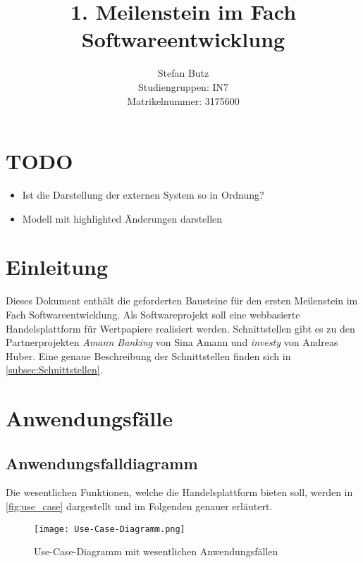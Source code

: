 \documentclass[12pt, a4paper, titlepage]{article}
\begin{document}
\title{1. Meilenstein im Fach Softwareentwicklung}
\author{Stefan Butz \\
		Studiengruppen: IN7 \\
		Matrikelnummer: 3175600}

\maketitle

\section{TODO}
\begin{itemize}
	\item Ist die Darstellung der externen System so in Ordnung?
	\item Modell mit highlighted Änderungen darstellen
\end{itemize}

\section{Einleitung}
Dieses Dokument enthält die geforderten Bausteine für den ersten Meilenstein
im Fach Softwareentwicklung.
Als Softwareprojekt soll eine webbasierte Handelsplattform für Wertpapiere
realisiert werden.
Schnittstellen gibt es zu den Partnerprojekten \textit{Amann Banking} von Sina
Amann und \textit{investy} von Andreas Huber.
Eine genaue Beschreibung der Schnittstellen finden sich in
\autoref{subsec:Schnittstellen}.

\section{Anwendungsfälle}
\label{sec:use_case}
\subsection{Anwendungsfalldiagramm}
Die wesentlichen Funktionen, welche die Handelsplattform  bieten soll, werden in
\autoref{fig:use_case} dargestellt und im Folgenden genauer erläutert.

\begin{figure}[H]
	\centering
    \texttt{[image: Use-Case-Diagramm.png]}
	\caption{Use-Case-Diagramm mit wesentlichen Anwendungsfällen}
	\label{fig:use_case}
\end{figure}
\end{document}

